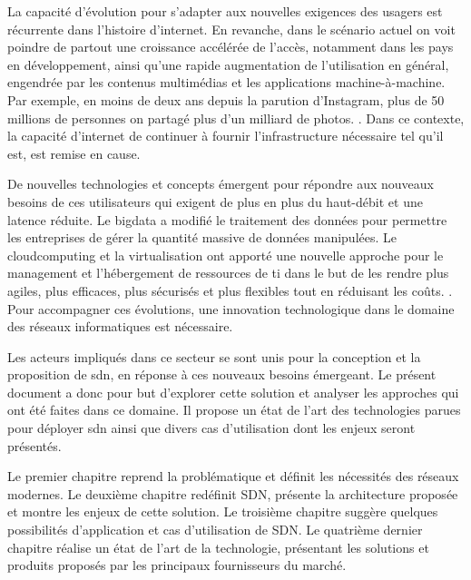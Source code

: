 \par
La capacité d'évolution pour s'adapter aux nouvelles exigences des usagers est récurrente dans l'histoire d'internet. 
En revanche, dans le scénario actuel on voit poindre de partout une croissance accélérée de l'accès, notamment dans les pays en développement, ainsi qu'une rapide augmentation de l'utilisation en général, engendrée par les contenus multimédias et les applications machine-à-machine. Par exemple, en moins de deux ans depuis la parution d'Instagram, plus de 50 millions de personnes on partagé plus d'un milliard de photos. \cite{deuxAnsInstagram}.
Dans ce contexte, la capacité d'internet de continuer à fournir l'infrastructure nécessaire tel qu'il est, est remise en cause. \cite{InternetSustainGrowthIntro}
\par
De nouvelles technologies et concepts émergent pour répondre aux nouveaux besoins de ces utilisateurs qui exigent de plus en plus du haut-débit et une latence réduite. Le \gls{bigdata} a modifié le traitement des données pour permettre les entreprises de gérer la quantité massive de données manipulées. \cite{IMBigData} Le \gls{cloudcomputing} et la \gls{virtualisation} ont apporté une nouvelle approche pour le management et l'hébergement de ressources de \gls{ti} dans le but de les rendre plus agiles, plus efficaces, plus sécurisés et plus flexibles tout en réduisant les coûts. \cite{CloudComputingIntelVision}. Pour accompagner ces évolutions, une innovation technologique dans le domaine des réseaux informatiques est nécessaire. \cite{InternetEvolutionRoleSoftwareEngineeringConclusion}
\par
Les acteurs impliqués dans ce secteur se sont unis pour la conception et la proposition de \gls{sdn}, en réponse à ces nouveaux besoins émergeant. 
Le présent document a donc pour but d'explorer cette solution et analyser les approches qui ont été faites dans ce domaine. Il propose un état de l'art des technologies parues pour déployer \gls{sdn} ainsi que divers cas d'utilisation dont les enjeux seront présentés.
\par
Le premier chapitre reprend la problématique et définit les nécessités des réseaux modernes. Le deuxième chapitre redéfinit SDN, présente la architecture proposée et montre les enjeux de cette solution. Le troisième chapitre suggère quelques possibilités d'application et cas d'utilisation de SDN. Le quatrième dernier chapitre réalise un état de l'art de la technologie, présentant les solutions et produits proposés par les principaux fournisseurs du marché.



